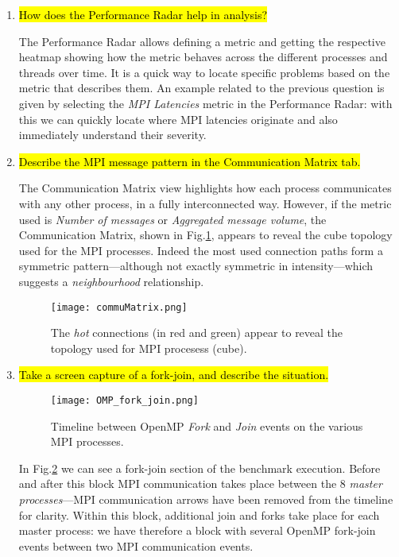 \documentclass{article}
\begin{document}
\begin{enumerate}
	\item \hl{How does the Performance Radar help in analysis?} ~

	The Performance Radar allows defining a metric and getting the respective heatmap showing how the metric behaves across the different processes and threads over time. It is a quick way to locate specific problems based on the metric that describes them.
	An example related to the previous question is given by selecting the \emph{MPI Latencies} metric in the Performance Radar: with this we can quickly locate where MPI latencies originate and also immediately understand their severity.

	\item \hl{Describe the MPI message pattern in the Communication Matrix tab.} ~

	The Communication Matrix view highlights how each process communicates with any other process, in a fully interconnected way. However, if the metric used is \emph{Number of messages} or \emph{Aggregated message volume}, the Communication Matrix, shown in Fig.\ref{fig:commuMatrix}, appears to reveal the cube topology used for the MPI processes. Indeed the most used connection paths form a symmetric pattern---although not exactly symmetric in intensity---which suggests a \emph{neighbourhood} relationship.

	\begin{figure}[p] %
		\begin{center}
			\texttt{[image: commuMatrix.png]}
		\cprotect\caption{The \emph{hot} connections (in red and green) appear to reveal the topology used for MPI procesess (cube).}
		\label{fig:commuMatrix}
		\end{center}
	\end{figure}

	\item \hl{Take a screen capture of a fork-join, and describe the situation.} ~

	\begin{figure}[p] %
		\begin{center}
			\texttt{[image: OMP\_fork\_join.png]}
		\cprotect\caption{Timeline between OpenMP \emph{Fork} and \emph{Join} events on the various MPI processes.}
		\label{fig:ompForkJoin}
		\end{center}
	\end{figure}

	In Fig.\ref{fig:ompForkJoin} we can see a fork-join section of the benchmark execution. Before and after this block MPI communication takes place between the 8 \emph{master processes}---MPI communication arrows have been removed from the timeline for clarity. Within this block, additional join and forks take place for each master process: we have therefore a block with several OpenMP fork-join events between two MPI communication events.


\end{enumerate}
\end{document}
